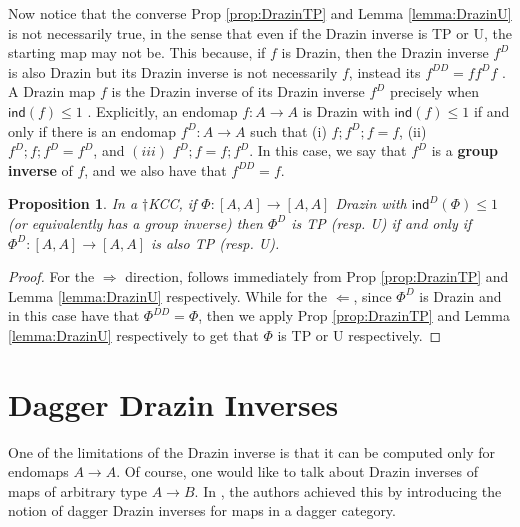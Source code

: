 \documentclass[submission,copyright,creativecommons]{eptcs}
\newtheorem{proposition}[observation]{Proposition}
\begin{document}
Now notice that the converse Prop \ref{prop:DrazinTP} and Lemma \ref{lemma:DrazinU} is not necessarily true, in the sense that even if the Drazin inverse is TP or U, the starting map may not be. This because, if $f$ is Drazin, then the Drazin inverse $f^D$ is also Drazin but its Drazin inverse is not necessarily $f$, instead its $f^{DD} = f f^D f$ \cite[Lem 3.11.(i)]{cockett2024drazin}. A Drazin map $f$ is the Drazin inverse of its Drazin inverse $f^D$ precisely when $\mathsf{ind}(f) \leq 1$ \cite[Lem 3.9 \& 3.11.(iii)]{cockett2024drazin}. Explicitly, an endomap $f: A \to A$ is Drazin with $\mathsf{ind}(f) \leq 1$ if and only if there is an endomap $f^D: A \to A$ such that (i) $f ;f^D ;f = f$, (ii) $f^D ;f;f^D = f^D$, and $(iii)$ $f^D ;f = f ;f^D$. In this case, we say that $f^D$ is a \textbf{group inverse} \cite[Def 3.8]{cockett2024drazin} of $f$, and we also have that $f^{DD}=f$. 

\begin{proposition} In a $\dagger$KCC, if $\Phi: {[A,A]} \to [A,A]$ Drazin with $\mathsf{ind}^D(\Phi) \leq 1$ (or equivalently has a group inverse) then $\Phi^D$ is TP (resp. U) if and only if $\Phi^D: {[A,A]} \to {[A,A]}$ is also TP (resp. U).
\end{proposition}
\begin{proof} For the $\Rightarrow$ direction, follows immediately from Prop \ref{prop:DrazinTP} and Lemma \ref{lemma:DrazinU} respectively. While for the $\Leftarrow$, since $\Phi^D$ is Drazin and in this case have that $\Phi^{DD}=\Phi$, then we apply Prop \ref{prop:DrazinTP} and Lemma \ref{lemma:DrazinU} respectively to get that $\Phi$ is TP or U respectively. 
\end{proof}

\section{Dagger Drazin Inverses}

One of the limitations of the Drazin inverse is that it can be computed only for endomaps $A \to A$. Of course, one would like to talk about Drazin inverses of maps of arbitrary type $A \to B$. In \cite{cockett2025dagger}, the authors achieved this by introducing the notion of dagger Drazin inverses for maps in a dagger category. 
\end{document}
